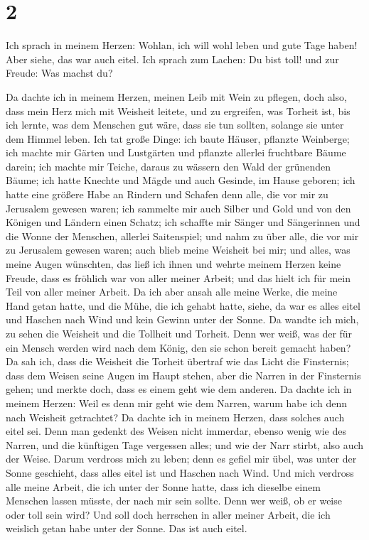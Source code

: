 \hypertarget{section-1}{%
\section{2}\label{section-1}}

 Ich sprach in meinem Herzen: Wohlan, ich will wohl leben
und gute Tage haben! Aber siehe, das war auch eitel.  Ich
sprach zum Lachen: Du bist toll! und zur Freude: Was machst du?

 Da dachte ich in meinem Herzen, meinen Leib mit Wein zu
pflegen, doch also, dass mein Herz mich mit Weisheit leitete, und zu
ergreifen, was Torheit ist, bis ich lernte, was dem Menschen gut wäre,
dass sie tun sollten, solange sie unter dem Himmel leben. 
Ich tat große Dinge: ich baute Häuser, pflanzte Weinberge;
 ich machte mir Gärten und Lustgärten und pflanzte
allerlei fruchtbare Bäume darein;  ich machte mir Teiche,
daraus zu wässern den Wald der grünenden Bäume;  ich hatte
Knechte und Mägde und auch Gesinde, im Hause geboren; ich hatte eine
größere Habe an Rindern und Schafen denn alle, die vor mir zu Jerusalem
gewesen waren;  ich sammelte mir auch Silber und Gold und
von den Königen und Ländern einen Schatz; ich schaffte mir Sänger und
Sängerinnen und die Wonne der Menschen, allerlei Saitenspiel;
 und nahm zu über alle, die vor mir zu Jerusalem gewesen
waren; auch blieb meine Weisheit bei mir;  und alles, was
meine Augen wünschten, das ließ ich ihnen und wehrte meinem Herzen keine
Freude, dass es fröhlich war von aller meiner Arbeit; und das hielt ich
für mein Teil von aller meiner Arbeit.  Da ich aber ansah
alle meine Werke, die meine Hand getan hatte, und die Mühe, die ich
gehabt hatte, siehe, da war es alles eitel und Haschen nach Wind und
kein Gewinn unter der Sonne.  Da wandte ich mich, zu
sehen die Weisheit und die Tollheit und Torheit. Denn wer weiß, was der
für ein Mensch werden wird nach dem König, den sie schon bereit gemacht
haben?  Da sah ich, dass die Weisheit die Torheit
übertraf wie das Licht die Finsternis;  dass dem Weisen
seine Augen im Haupt stehen, aber die Narren in der Finsternis gehen;
und merkte doch, dass es einem geht wie dem anderen.  Da
dachte ich in meinem Herzen: Weil es denn mir geht wie dem Narren, warum
habe ich denn nach Weisheit getrachtet? Da dachte ich in meinem Herzen,
dass solches auch eitel sei.  Denn man gedenkt des Weisen
nicht immerdar, ebenso wenig wie des Narren, und die künftigen Tage
vergessen alles; und wie der Narr stirbt, also auch der Weise.
 Darum verdross mich zu leben; denn es gefiel mir übel,
was unter der Sonne geschieht, dass alles eitel ist und Haschen nach
Wind.  Und mich verdross alle meine Arbeit, die ich unter
der Sonne hatte, dass ich dieselbe einem Menschen lassen müsste, der
nach mir sein sollte.  Denn wer weiß, ob er weise oder
toll sein wird? Und soll doch herrschen in aller meiner Arbeit, die ich
weislich getan habe unter der Sonne. Das ist auch eitel.

